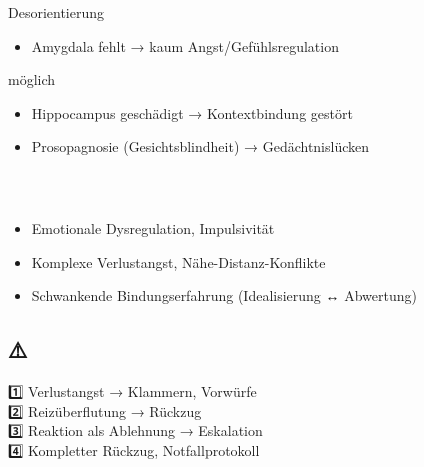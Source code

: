 Desorientierung

\begin{itemize}[label=\textcolor{ctmmOrange}{\faArrowRight}]
\tightlist
\item
  Amygdala fehlt → kaum Angst/Gefühlsregulation
\end{itemize}

möglich

\begin{itemize}[label=\textcolor{ctmmOrange}{\faArrowRight}]
\item
  Hippocampus geschädigt → Kontextbindung gestört
\item
  Prosopagnosie (Gesichtsblindheit) → Gedächtnislücken
\end{itemize}

\hypertarget{sie-borderline-adhs-ass}{%
\subsubsection[🔴 \textbf{\textcolor{ctmmBlue}{\1}}]{\texorpdfstring{\protect\hypertarget{sie-borderline-adhs}{}{}🔴 \textbf{\textcolor{ctmmBlue}{\1}}}{🔴 SIE (Borderline, ADHS, ASS)}}\label{sie-borderline-adhs-ass}}

\begin{itemize}[label=\textcolor{ctmmOrange}{\faArrowRight}]
\item
  Emotionale Dysregulation, Impulsivität
\item
  Komplexe Verlustangst, Nähe-Distanz-Konflikte
\item
  Schwankende Bindungserfahrung (Idealisierung ↔ Abwertung)
\end{itemize}

\hfill\break
\hfill\break

\hypertarget{dynamik-trigger-loop-beidseitig-selbstverstuxe4rkend}{%
\subsection[ ⚠️ \ul{\textbf{\textcolor{ctmmBlue}{\1}}}]{\texorpdfstring{\protect\hypertarget{X0bce8141eefab512d9e0b9323ec320b0c385edf}{}{} ⚠️ \ul{\textbf{\textcolor{ctmmBlue}{\1}}}}{ ⚠️ DYNAMIK: TRIGGER-LOOP (Beidseitig selbstverstärkend)}}\label{dynamik-trigger-loop-beidseitig-selbstverstuxe4rkend}}

1️⃣ \textbf{\textcolor{ctmmBlue}{\1}} Verlustangst → Klammern, Vorwürfe\\
2️⃣ \textbf{\textcolor{ctmmBlue}{\1}} Reizüberflutung → Rückzug\\
3️⃣ \textbf{\textcolor{ctmmBlue}{\1}} Reaktion als Ablehnung → Eskalation\\
4️⃣ \textbf{\textcolor{ctmmBlue}{\1}} Kompletter Rückzug, Notfallprotokoll

